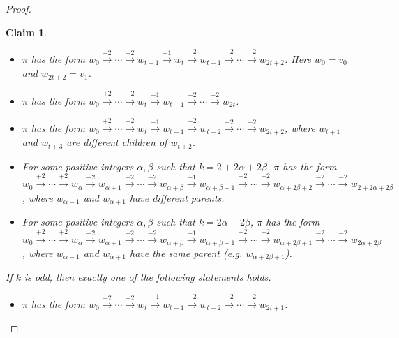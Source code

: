 \documentclass[12pt]{article}
\newtheorem{claim}[theorem]{Claim}
\numberwithin{equation}{section}
\newcommand{\1}{\mathbf{1}}
\begin{document}
\begin{proof}
\begin{claim}
 		\begin{itemize}
 			\item[(a)] $\pi$ has the form $w_0\stackrel{-2}{\rightarrow}\cdots \stackrel{-2}{\rightarrow}w_{t-1}\stackrel{-1}{\rightarrow}w_{t}\stackrel{+2}{\rightarrow}w_{t+1}\stackrel{+2}{\rightarrow}\cdots \stackrel{+2}{\rightarrow}w_{2t+2}$. Here $w_0=v_0$ and $w_{2t+2}=v_1$.
 			
 			\item[(b)] $\pi$ has the form $w_0\stackrel{+2}{\rightarrow}\cdots \stackrel{+2}{\rightarrow}w_{t}\stackrel{-1}{\rightarrow}w_{t+1}\stackrel{-2}{\rightarrow}\cdots \stackrel{-2}{\rightarrow}w_{2t}$.
 			
 			\item[(b')] $\pi$ has the form $w_0\stackrel{+2}{\rightarrow}\cdots \stackrel{+2}{\rightarrow}w_{t}\stackrel{-1}{\rightarrow}w_{t+1}\stackrel{+2}{\rightarrow}w_{t+2}\stackrel{-2}{\rightarrow}\cdots \stackrel{-2}{\rightarrow}w_{2t+2}$, where $w_{t+1}$ and $w_{t+3}$ are different children of $w_{t+2}$.
 			
 			\item[(c)]  For some positive integers $\alpha,\beta$ such that $k=2+2\alpha+2\beta$, $\pi$ has the form 
 			$w_0\stackrel{+2}{\rightarrow}\cdots \stackrel{+2}{\rightarrow}w_{\alpha}\stackrel{-2}{\rightarrow}w_{\alpha+1}\stackrel{-2}{\rightarrow}\cdots \stackrel{-2}{\rightarrow} w_{\alpha+\beta}\stackrel{-1}{\rightarrow}w_{\alpha+\beta+1}\stackrel{+2}{\rightarrow}\cdots \stackrel{+2}{\rightarrow}w_{\alpha+2\beta+2}\stackrel{-2}{\rightarrow}\cdots\stackrel{-2}{\rightarrow}w_{2+2\alpha+2\beta}$, where $w_{\alpha-1}$ and $w_{\alpha+1}$ have different parents.
 			
 			
 			\item[(c')] For some positive integers $\alpha,\beta$ such that $k=2\alpha+2\beta$, $\pi$ has the form 
 			$w_0\stackrel{+2}{\rightarrow}\cdots \stackrel{+2}{\rightarrow}w_{\alpha}\stackrel{-2}{\rightarrow}w_{\alpha+1}\stackrel{-2}{\rightarrow}\cdots \stackrel{-2}{\rightarrow} w_{\alpha+\beta}\stackrel{-1}{\rightarrow}w_{\alpha+\beta+1}\stackrel{+2}{\rightarrow}\cdots \stackrel{+2}{\rightarrow}w_{\alpha+2\beta+1}\stackrel{-2}{\rightarrow}\cdots\stackrel{-2}{\rightarrow}w_{2\alpha+2\beta}$, where $w_{\alpha-1}$ and $w_{\alpha+1}$ have the same parent (e.g. $w_{\alpha+2\beta+1}$).
 		\end{itemize}
 		
 		
 		If $k$ is odd,  then exactly one of the following statements holds.
 		\begin{itemize}
 			\item[(d)] $\pi$ has the form $w_0\stackrel{-2}{\rightarrow}\cdots \stackrel{-2}{\rightarrow}w_{t}\stackrel{+1}{\rightarrow}w_{t+1}\stackrel{+2}{\rightarrow}w_{t+2}\stackrel{+2}{\rightarrow}\cdots \stackrel{+2}{\rightarrow}w_{2t+1}$. 
 			

\end{itemize}
\end{claim}
\end{proof}
\end{document}
